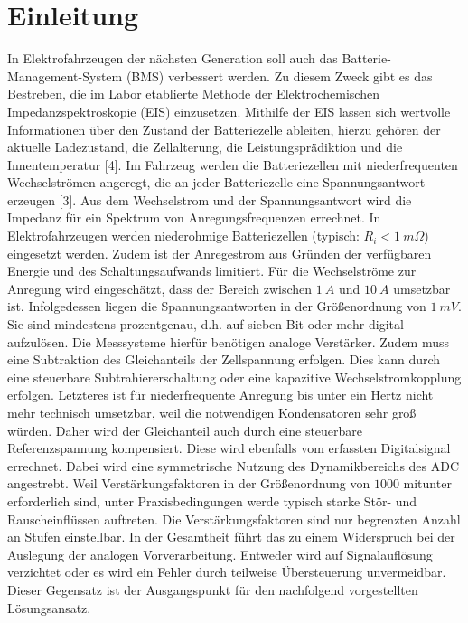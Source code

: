\section{Einleitung}	

In Elektrofahrzeugen der nächsten Generation soll auch das Batterie-Management-System (BMS) verbessert werden. Zu diesem Zweck gibt es das Bestreben, die im Labor etablierte Methode der Elektrochemischen Impedanzspektroskopie (EIS) einzusetzen. Mithilfe der EIS lassen sich wertvolle Informationen über den Zustand der Batteriezelle ableiten, hierzu gehören der aktuelle Ladezustand, die Zellalterung, die Leistungsprädiktion und die Innentemperatur [4]. Im Fahrzeug werden die Batteriezellen mit niederfrequenten Wechselströmen angeregt, die an jeder Batteriezelle eine Spannungsantwort erzeugen [3]. Aus dem Wechselstrom und der Spannungsantwort wird die Impedanz für ein Spektrum von Anregungsfrequenzen errechnet. In Elektrofahrzeugen werden niederohmige Batteriezellen (typisch: $R_i < \SI{1}{m\Omega}$) eingesetzt werden. Zudem ist der Anregestrom aus Gründen der verfügbaren Energie und des Schaltungsaufwands limitiert. Für die Wechselströme zur Anregung wird eingeschätzt, dass der Bereich zwischen $\SI{1}{A}$ und $\SI{10}{A}$ umsetzbar ist. Infolgedessen liegen die Spannungsantworten in der Größenordnung  von $\SI{1}{mV}$. Sie sind mindestens prozentgenau, d.h. auf sieben Bit oder mehr digital aufzulösen. Die Messsysteme hierfür benötigen analoge Verstärker. Zudem muss eine Subtraktion des Gleichanteils der Zellspannung erfolgen. Dies kann durch eine steuerbare Subtrahiererschaltung oder eine kapazitive Wechselstromkopplung erfolgen. Letzteres ist für niederfrequente Anregung bis unter ein Hertz nicht mehr technisch umsetzbar, weil die notwendigen Kondensatoren sehr groß würden. Daher wird der Gleichanteil auch durch eine steuerbare Referenzspannung kompensiert. Diese wird ebenfalls vom erfassten Digitalsignal errechnet. Dabei wird eine symmetrische Nutzung des Dynamikbereichs des ADC angestrebt. 
Weil Verstärkungsfaktoren in der Größenordnung von $1000$ mitunter erforderlich sind, unter Praxisbedingungen werde typisch starke Stör- und Rauscheinflüssen auftreten. Die Verstärkungsfaktoren sind nur begrenzten Anzahl an Stufen einstellbar. In der Gesamtheit führt das zu einem Widerspruch bei der Auslegung der analogen Vorverarbeitung. Entweder wird auf Signalauflösung verzichtet oder es wird ein Fehler durch teilweise Übersteuerung unvermeidbar. Dieser Gegensatz ist der Ausgangspunkt für den nachfolgend vorgestellten Lösungsansatz.

